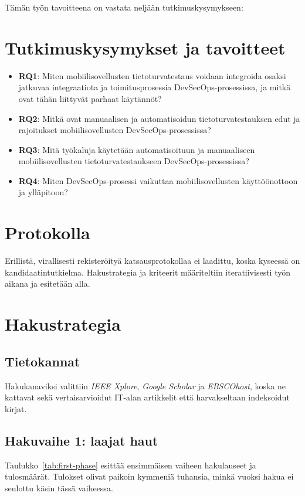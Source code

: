 \documentclass[bscthesis,finnish,oneside,biblatex]{uefcsthesis}
\begin{document}
Tämän työn tavoitteena on vastata neljään tutkimuskysymykseen:

\section{Tutkimuskysymykset ja tavoitteet}
\label{sec:rq}
\begin{itemize}
  \item \textbf{RQ1}: Miten mobiilisovellusten tietoturvatestaus voidaan integroida osaksi jatkuvaa integraatiota ja toimitusprosessia DevSecOps-prosessissa, ja mitkä ovat tähän liittyvät parhaat käytännöt?
  \item \textbf{RQ2}: Mitkä ovat manuaalisen ja automatisoidun tietoturvatestauksen edut ja rajoitukset mobiilisovellusten DevSecOps-prosessissa?
  \item \textbf{RQ3}: Mitä työkaluja käytetään automatisoituun ja manuaaliseen mobiilisovellusten tietoturvatestaukseen DevSecOps-prosessissa?
  \item \textbf{RQ4}: Miten DevSecOps-prosessi vaikuttaa mobiilisovellusten käyttöönottoon ja ylläpitoon?
\end{itemize}

\section{Protokolla}
\label{sec:protocol}

Erillistä, virallisesti rekisteröityä katsausprotokollaa ei laadittu,
koska kyseessä on kandidaatintutkielma. Hakustrategia ja kriteerit
määriteltiin iteratiivisesti työn aikana ja esitetään alla.


\section{Hakustrategia}
\label{sec:search-strategy}

\subsection{Tietokannat}
Hakukanaviksi valittiin \emph{IEEE Xplore}, \emph{Google Scholar}
ja \emph{EBSCOhost}, koska ne kattavat sekä vertaisarvioidut
IT-alan artikkelit että harvakseltaan indeksoidut kirjat.

\subsection{Hakuvaihe 1: laajat haut}
Taulukko~\ref{tab:first-phase} esittää ensimmäisen vaiheen
hakulauseet ja tulosmäärät. Tulokset olivat paikoin kymmeniä tuhansia,
minkä vuoksi hakua ei seulottu käsin tässä vaiheessa.
\end{document}
